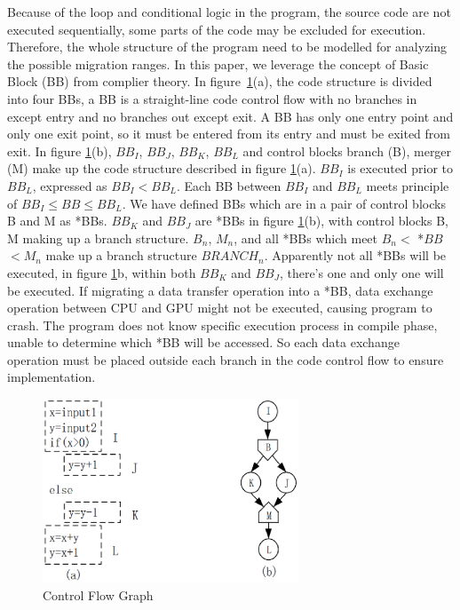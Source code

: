 \documentclass[10pt,conference]{IEEEtran}
\begin{document}
Because of the loop and conditional logic in the program, the source code are not executed sequentially, some parts of the code may be excluded  for execution. Therefore, the whole structure of the program need to be modelled for analyzing the possible migration ranges. In this paper, we leverage the concept of Basic Block (BB) from complier theory\cite{IEEEhowto:18}. In figure~\ref{figure1}(a), the code structure is divided into four BBs, a BB is a straight-line code control flow with no branches in except entry and no branches out except exit. A BB has only one entry point and only one exit point, so it must be entered from its entry and must be exited from exit\cite{IEEEhowto:20}. In figure \ref{figure1}(b), $BB_I$, $BB_J$, $BB_K$, $BB_L$ and control blocks branch (B), merger (M) make up the code structure described in figure \ref{figure1}(a). $BB_I$ is executed prior to $BB_L$, expressed as $BB_I < BB_L$. Each BB between $BB_I$ and $BB_L$ meets principle of $BB_I \le BB \le BB_L$. We have defined BBs which are in a pair of control blocks B and M as *BBs. $BB_K$ and $BB_J$ are *BBs in figure \ref{figure1}(b), with control blocks B, M making up a branch structure. $B_n$, $M_n$, and all *BBs which meet $B_n <$ *$BB$ $< M_n$ make up a branch structure $BRANCH_n$. Apparently not all *BBs will be executed, in figure \ref{figure1}b, within both $BB_K$ and $BB_J$, there's one and only one will be executed. If migrating a data transfer operation into a *BB, data exchange operation between CPU and GPU might not be executed, causing program to crash. The program does not know specific execution process in compile phase, unable to determine which *BB will be accessed. So each data exchange operation must be placed outside each branch in the code control flow to ensure implementation.






\begin{figure}
 \centering
 \includegraphics[width=3in]{image006.eps}
 \caption{Control Flow Graph}\label{figure1}
\end{figure}
\end{document}
